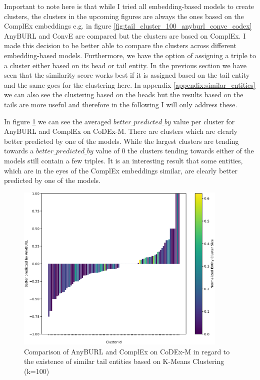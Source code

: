 Important to note here is that while I tried all embedding-based models to create clusters, the clusters in the upcoming figures are always the ones based on the ComplEx embeddings e.g. in figure \ref{fig:tail_cluster_100_anyburl_conve_codex} AnyBURL and ConvE are compared but the clusters are based on ComplEx. I made this decision to be better able to compare the clusters across different embedding-based models. Furthermore, we have the option of assigning a triple to a cluster either based on its head or tail entity. In the previous section we have seen that the similarity score works best if it is assigned based on the tail entity and the same goes for the clustering here. In appendix \ref{appendix:similar_entities} we can also see the clustering based on the heads but the results based on the tails are more useful and therefore in the following I will only address these.

In figure \ref{fig:tail_cluster_100_anyburl_complex_codex} we can see the averaged $better\_predicted\_by$ value per cluster for AnyBURL and ComplEx on CoDEx-M. There are clusters which are clearly better predicted by one of the models. While the largest clusters are tending towards a $better\_predicted\_by$ value of $0$ the clusters tending towards either of the models still contain a few triples. It is an interesting result that some entities, which are in the eyes of the ComplEx embeddings similar, are clearly better predicted by one of the models.

\begin{figure}[H]
\centering
\includegraphics[width=0.9\textwidth]{images/tail_cluster_100_anyburl_complex_codex.PNG}
\caption{Comparison of AnyBURL and ComplEx on CoDEx-M in regard to the existence of similar tail entities based on K-Means Clustering (k=100)}
\label{fig:tail_cluster_100_anyburl_complex_codex}
\end{figure}

